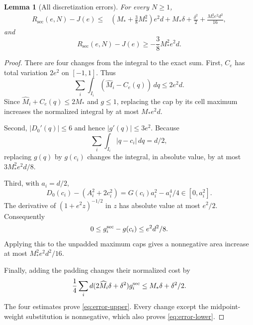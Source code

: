 \documentclass[11pt]{amsart}
\newtheorem{lemma}[theorem]{Lemma}
\theoremstyle{definition}
\theoremstyle{remark}
\newcommand{\Rsec}{R_{\mathrm{sec}}}
\begin{document}
\begin{lemma}[All discretization errors]\label{lem:finite-error}
For every $N\ge1$,
\begin{equation}\label{eq:error-upper}
\begin{split}
 \Rsec(e,N)-J(e)\le{}&
 \left(M_*+\frac38M_*^2\right)e^2d
 +M_*\delta+\frac{\delta^2}{2}
 +\frac{M_*^2e^2d^2}{16},
\end{split}
\end{equation}
and
\begin{equation}\label{eq:error-lower}
 \Rsec(e,N)-J(e)\ge-\frac38M_*^2e^2d.
\end{equation}
\end{lemma}
\begin{proof}
There are four changes from the integral to the exact sum.
First, $C_e$ has total variation $2e^2$ on $[-1,1]$. Thus
\[
 \sum_i\int_{I_i}(\widehat M_i-C_e(q))\,dq\le2e^2d.
\]
Since $\widehat M_i+C_e(q)\le2M_*$ and $g\le1$, replacing the
cap by its cell maximum increases the normalized integral by at most
$M_*e^2d$.

Second, $|D_0'(q)|\le6$ and hence $|g'(q)|\le3e^2$. Because
\[
 \sum_i\int_{I_i}|q-c_i|\,dq=d/2,
\]
replacing $g(q)$ by $g(c_i)$ changes the integral, in absolute value,
by at most $3M_*^2e^2d/8$.

Third, with $a_i=d/2$,
\[
 D_0(c_i)-(A_i^2+2c_i^2)
 =G(c_i)a_i^2-a_i^4/4\in[0,a_i^2].
\]
The derivative of $(1+e^2z)^{-1/2}$ in $z$ has absolute value at
most $e^2/2$. Consequently
\[
 0\le g_i^{\rm sec}-g(c_i)\le e^2d^2/8.
\]
Applying this to the unpadded maximum caps gives a nonnegative area
increase at most $M_*^2e^2d^2/16$.

Finally, adding the padding changes their normalized cost by
\[
 \frac14\sum_i d(2\widehat M_i\delta+\delta^2)g_i^{\rm sec}
 \le M_*\delta+\delta^2/2.
\]
The four estimates prove \eqref{eq:error-upper}. Every change except
the midpoint-weight substitution is nonnegative, which also proves
\eqref{eq:error-lower}.
\end{proof}
\end{document}

